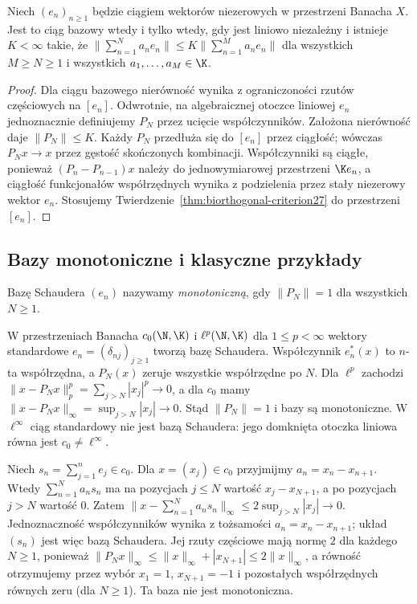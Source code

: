 \begin{wniosek}
\label{cor:basic-sequence27}
Niech $(e_n)_{n\ge1}$ będzie ciągiem wektorów niezerowych
w przestrzeni Banacha $X$. Jest to ciąg bazowy wtedy i tylko wtedy,
gdy jest liniowo niezależny i istnieje $K<\infty$ takie, że
$\|\sum_{n=1}^Na_ne_n\|
\le K\|\sum_{n=1}^Ma_ne_n\|$
dla wszystkich $M\ge N\ge1$ i wszystkich $a_1,\ldots,a_M\in\K$.
\end{wniosek}
\begin{proof}
Dla ciągu bazowego nierówność wynika z ograniczoności
rzutów częściowych na $[e_n]$.
Odwrotnie, na algebraicznej otoczce liniowej $e_n$
jednoznacznie definiujemy $P_N$ przez ucięcie współczynników.
Założona nierówność daje $\|P_N\|\le K$.
Każdy $P_N$ przedłuża się do $[e_n]$ przez ciągłość;
wówczas $P_Nx\to x$ przez gęstość skończonych kombinacji.
Współczynniki są ciągłe, ponieważ
$(P_n-P_{n-1})x$ należy do jednowymiarowej przestrzeni
$\K e_n$, a ciągłość funkcjonałów współrzędnych
wynika z podzielenia przez stały niezerowy wektor $e_n$.
Stosujemy Twierdzenie~\ref{thm:biorthogonal-criterion27}
do przestrzeni $[e_n]$.
\end{proof}

\subsection{Bazy monotoniczne i klasyczne przykłady}

\begin{definicja}
\label{def:monotonic27}
Bazę Schaudera $(e_n)$ nazywamy \emph{monotoniczną}, gdy
$\|P_N\|=1$ dla wszystkich $N\ge1$.
\end{definicja}

\begin{przyklad}
\label{ex:sequence-bases27}
W przestrzeniach Banacha $c_0(\N,\K)$ i $\ell^p(\N,\K)$
dla $1\le p<\infty$ wektory standardowe
$e_n=(\delta_{nj})_{j\ge1}$ tworzą bazę Schaudera.
Współczynnik $e_n^*(x)$ to $n$-ta współrzędna,
a $P_N(x)$ zeruje wszystkie współrzędne po $N$.
Dla $\ell^p$ zachodzi
$\|x-P_Nx\|_p^p=\sum_{j>N}|x_j|^p\to0$,
a dla $c_0$ mamy $\|x-P_Nx\|_\infty=\sup_{j>N}|x_j|\to0$.
Stąd $\|P_N\|=1$ i bazy są monotoniczne.
W $\ell^\infty$ ciąg standardowy nie jest bazą Schaudera:
jego domknięta otoczka liniowa równa jest $c_0\ne\ell^\infty$.
\end{przyklad}

\begin{przyklad}
\label{ex:summing-basis27}
Niech $s_n=\sum_{j=1}^ne_j\in c_0$.
Dla $x=(x_j)\in c_0$ przyjmijmy $a_n=x_n-x_{n+1}$.
Wtedy $\sum_{n=1}^Na_ns_n$ ma na pozycjach $j\le N$
wartość $x_j-x_{N+1}$, a po pozycjach $j>N$ wartość $0$.
Zatem
$\|x-\sum_{n=1}^Na_ns_n\|_\infty
\le2\sup_{j>N}|x_j|\to0$.
Jednoznaczność współczynników wynika z tożsamości
$a_n=x_n-x_{n+1}$; układ $(s_n)$ jest więc bazą Schaudera.
Jej rzuty częściowe mają normę $2$ dla każdego $N\ge1$,
ponieważ $\|P_Nx\|_\infty
\le\|x\|_\infty+|x_{N+1}|\le2\|x\|_\infty$,
a równość otrzymujemy przez wybór $x_1=1$, $x_{N+1}=-1$
i pozostałych współrzędnych równych zeru (dla $N\ge1$).
Ta baza nie jest monotoniczna.
\end{przyklad}

